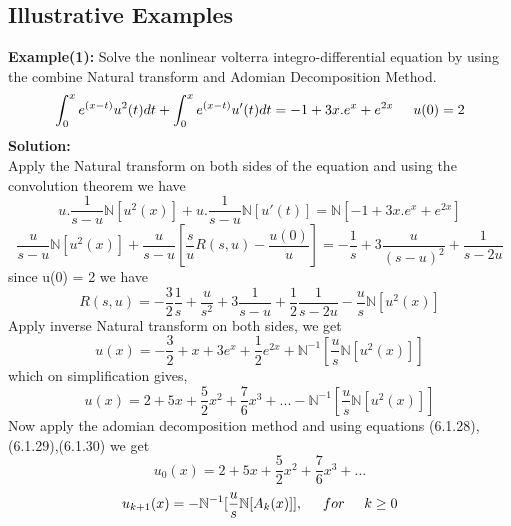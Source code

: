  \subsection{Illustrative Examples} 
 \textbf{Example(1):} Solve the nonlinear volterra integro-differential equation by using the combine Natural transform and Adomian Decomposition Method.
 \begin{equation*}
 \int_{0}^{x}e^{(x-t)}u^2(t)dt + \int_{0}^{x}e^{(x-t)}u'(t)dt = -1 + 3x.e^{x} + e^{2x}   \hspace{0.5 cm} u(0) = 2
 \end{equation*}
 \textbf{Solution:}\\
 Apply the Natural transform on both sides of the equation and using the convolution theorem we have
\begin{equation*}
u.\frac{1}{s-u} \mathbb{N}[u^2(x)] + u.\frac{1}{s-u}\mathbb{N}[u'(t)] = \mathbb{N}[-1 + 3x.e^{x} + e^{2x}]
\end{equation*}
\begin{equation*}
\frac{u}{s-u}\mathbb{N}[u^2(x)] + \frac{u}{s-u}[\frac{s}{u}R(s,u) - \frac{u(0)}{u}] = -\frac{1}{s} + 3\frac{u}{(s-u)^2} + \frac{1}{s-2u} 
\end{equation*}
since u(0) = 2 we have
\begin{equation*}
R(s,u) = -\frac{3}{2}\frac{1}{s} + \frac{u}{s^2} + 3\frac{1}{s-u} + \frac{1}{2}\frac{1}{s-2u} - \frac{u}{s}\mathbb{N}[u^2(x)]
\end{equation*}
Apply inverse Natural transform on both sides, we get
\begin{equation*}
u(x) =  - \frac{3}{2} + x + 3e^{x} + \frac{1}{2}e^{2x} + \mathbb{N}^{-1}[\frac{u}{s}\mathbb{N}[u^2(x)]]
\end{equation*}
which on simplification gives,
\begin{equation*}
u(x) =  2 + 5x + \frac{5}{2}x^2 + \frac{7}{6}x^3 +... - \mathbb{N}^{-1}[\frac{u}{s}\mathbb{N}[u^2(x)]]
\end{equation*}
Now apply the adomian decomposition method and using equations (6.1.28),(6.1.29),(6.1.30) we get
\begin{equation*}
u_{0}(x) = 2 + 5x + \frac{5}{2}x^2 + \frac{7}{6}x^3 +...
\end{equation*}
\begin{equation*}
   { u_{k+1}(x) = - \mathbb{N}^{-1}[\frac{u}{s}\mathbb{N}[A_{k}(x)]] , {\hspace{0.5 cm}} for{\hspace{0.5 cm}} k\geq 0}
\end{equation*}
